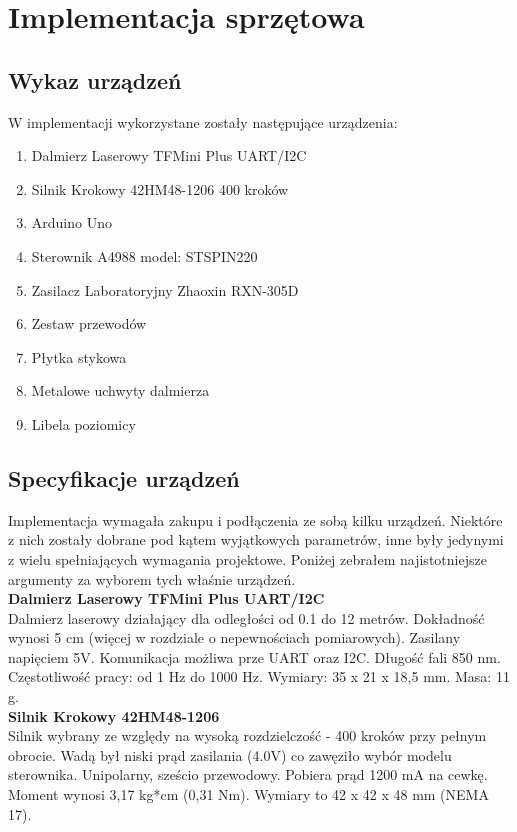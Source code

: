 \section {Implementacja sprzętowa}
\subsection {Wykaz urządzeń}

W implementacji wykorzystane zostały następujące urządzenia:

\begin{enumerate}
\item Dalmierz Laserowy TFMini Plus UART/I2C
\item Silnik Krokowy 42HM48-1206 400 kroków
\item Arduino Uno
\item Sterownik A4988 model: STSPIN220
\item Zasilacz Laboratoryjny Zhaoxin RXN-305D
\item Zestaw przewodów
\item Płytka stykowa
\item Metalowe uchwyty dalmierza
\item Libela poziomicy
\end{enumerate}

\subsection {Specyfikacje urządzeń}
Implementacja wymagała zakupu i podłączenia ze sobą kilku urządzeń. Niektóre z nich zostały dobrane pod kątem wyjątkowych parametrów, inne były jedynymi z wielu spełniających wymagania projektowe. Poniżej zebrałem najistotniejsze argumenty za wyborem tych właśnie urządzeń.\\

\textbf{Dalmierz Laserowy TFMini Plus UART/I2C}\\
Dalmierz laserowy działający dla odległości od 0.1 do 12 metrów. Dokładność wynosi 5 cm (więcej w rozdziale o nepewnościach pomiarowych). Zasilany napięciem 5V. Komunikacja możliwa prze UART oraz I2C. Długość fali 850 nm. Częstotliwość pracy: od 1 Hz do 1000 Hz. Wymiary: 35 x 21 x 18,5 mm. Masa: 11 g.\\

\textbf{Silnik Krokowy 42HM48-1206}\\
Silnik wybrany ze względy na wysoką rozdzielczość - 400 kroków przy pełnym obrocie. Wadą był niski prąd zasilania (4.0V) co zawęziło wybór modelu sterownika. Unipolarny, sześcio przewodowy. Pobiera prąd 1200 mA na cewkę. Moment wynosi 3,17 kg*cm (0,31 Nm). Wymiary to 42 x 42 x 48 mm (NEMA 17).\\

